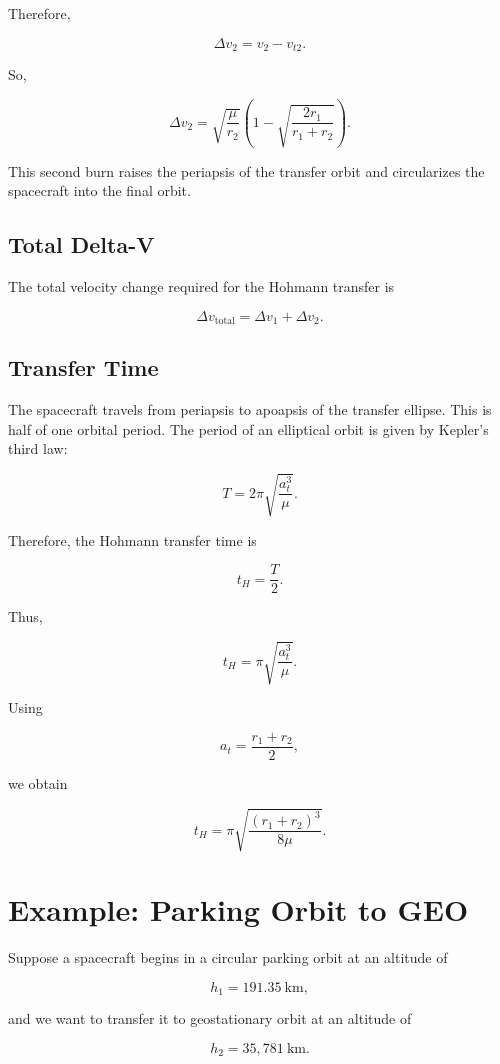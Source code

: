 \documentclass{article}
\begin{document}
Therefore,

\[
\Delta v_2
=
v_2-v_{t2}.
\]

So,

\[
\boxed{
\Delta v_2
=
\sqrt{\frac{\mu}{r_2}}
\left(
1-
\sqrt{\frac{2r_1}{r_1+r_2}}
\right)
}.
\]

This second burn raises the periapsis of the transfer orbit and circularizes the spacecraft into the final orbit.


\subsection{Total Delta-V}

The total velocity change required for the Hohmann transfer is

\[
\boxed{
\Delta v_{\text{total}}
=
\Delta v_1+\Delta v_2
}.
\]


\subsection{Transfer Time}

The spacecraft travels from periapsis to apoapsis of the transfer ellipse. This is half of one orbital period. The period of an elliptical orbit is given by Kepler's third law:

\[
T
=
2\pi
\sqrt{
\frac{a_t^3}{\mu}
}.
\]

Therefore, the Hohmann transfer time is

\[
t_H
=
\frac{T}{2}.
\]

Thus,

\[
\boxed{
t_H
=
\pi
\sqrt{
\frac{a_t^3}{\mu}
}
}.
\]

Using

\[
a_t
=
\frac{r_1+r_2}{2},
\]

we obtain

\[
\boxed{
t_H
=
\pi
\sqrt{
\frac{(r_1+r_2)^3}{8\mu}
}
}.
\]


\section{Example: Parking Orbit to GEO}

Suppose a spacecraft begins in a circular parking orbit at an altitude of

\[
h_1 = 191.35~\text{km},
\]

and we want to transfer it to geostationary orbit at an altitude of

\[
h_2 = 35{,}781~\text{km}.
\]
\end{document}
